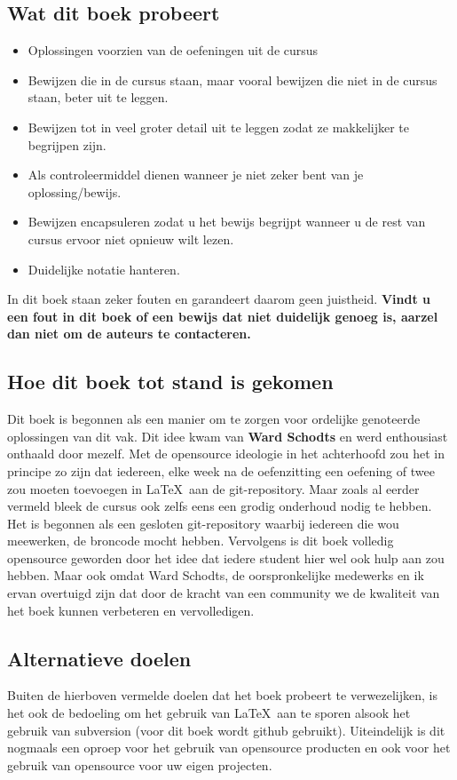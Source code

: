 \documentclass[lineaire_algebra_oplossingen.tex]{subfiles}
\begin{document}
\subsection*{Wat dit boek probeert}
\begin{itemize}
\item Oplossingen voorzien van de oefeningen uit de cursus
\item Bewijzen die in de cursus staan, maar vooral bewijzen die niet in de cursus staan, beter uit te leggen.
\item Bewijzen tot in veel groter detail uit te leggen zodat ze makkelijker te begrijpen zijn. 
\item Als controleermiddel dienen wanneer je niet zeker bent van je oplossing/bewijs.
\item Bewijzen encapsuleren zodat u het bewijs begrijpt wanneer u de rest van cursus ervoor niet opnieuw wilt lezen. 
\item Duidelijke notatie hanteren.
\end{itemize}
In dit boek staan zeker fouten en garandeert daarom geen juistheid.
\textbf{Vindt u een fout in dit boek of een bewijs dat niet duidelijk genoeg is, aarzel dan niet om de auteurs te contacteren.}
\subsection*{Hoe dit boek tot stand is gekomen}
Dit boek is begonnen als een manier om te zorgen voor ordelijke genoteerde oplossingen van dit vak. Dit idee kwam van \textbf{Ward Schodts} en werd enthousiast onthaald door mezelf. Met de opensource ideologie in het achterhoofd zou het in principe zo zijn dat iedereen, elke week na de oefenzitting een oefening of twee zou moeten toevoegen in \LaTeX \ aan de git-repository. Maar zoals al eerder vermeld bleek de cursus ook zelfs eens een grodig onderhoud nodig te hebben. Het is begonnen als een gesloten git-repository waarbij iedereen die wou meewerken, de broncode mocht hebben. Vervolgens is dit boek volledig opensource geworden door het idee dat iedere student hier wel ook hulp aan zou hebben. Maar ook omdat Ward Schodts, de oorspronkelijke medewerks en ik ervan overtuigd zijn dat door de kracht van een community we de kwaliteit van het boek kunnen verbeteren en vervolledigen.

\subsection*{Alternatieve doelen}
Buiten de hierboven vermelde doelen dat het boek probeert te verwezelijken, is het ook de bedoeling om het gebruik van \LaTeX \ aan te sporen alsook het gebruik van subversion (voor dit boek wordt github gebruikt). Uiteindelijk is dit nogmaals een oproep voor het gebruik van opensource producten en ook voor het gebruik van opensource voor uw eigen projecten.
\end{document}

